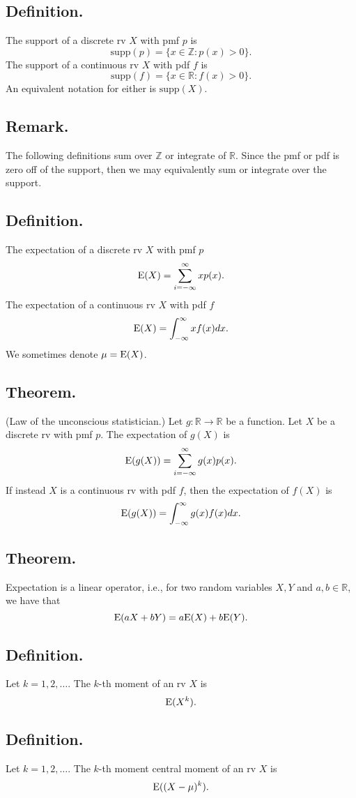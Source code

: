 \documentclass[titlepage]{article}
\begin{document}
\subsection{Definition.} The support of a discrete rv $X$ with pmf $p$ is  
$$\text{supp}(p) = \{x \in \mathbb{Z} : p(x) > 0\}.$$
The support of a continuous rv $X$ with pdf $f$ is
$$\text{supp}(f) = \{x \in \mathbb{R} : f(x) > 0\}.$$
An equivalent notation for either is $\text{supp}(X)$.

\subsection{Remark.} The following definitions sum over $\mathbb{Z}$ or integrate of $\mathbb{R}$. Since the pmf or pdf is zero off of the support, then we may equivalently sum or integrate over the support.

\subsection{Definition.} The expectation of a discrete rv $X$ with pmf $p$
$$\text{E}(X) = \sum_{i=-\infty}^{\infty}xp(x).$$
The expectation of a continuous rv $X$ with pdf $f$
$$\text{E}(X) = \int_{-\infty}^{\infty}xf(x)dx.$$
We sometimes denote $\mu = \text{E}(X)$.

\subsection{Theorem.} (Law of the unconscious statistician.) Let $g: \mathbb{R} \to \mathbb{R}$ be a function. Let $X$ be a discrete rv with pmf $p$. The expectation of $g(X)$ is 
$$\text{E}(g(X)) = \sum_{i=-\infty}^{\infty}g(x)p(x).$$
If instead $X$ is a continuous rv with pdf $f$, then the expectation of $f(X)$ is
$$\text{E}(g(X)) = \int_{-\infty}^{\infty}g(x)f(x)dx.$$

\subsection{Theorem.} Expectation is a linear operator, i.e., for two random variables $X, Y$ and $a, b \in \mathbb{R}$, we have that 
$$\text{E}(aX + bY) = a\text{E}(X) + b\text{E}(Y).$$

\subsection{Definition.} Let $k = 1, 2, \ldots$. The $k$-th moment of an rv $X$ is 
$$\text{E}(X^{k}).$$

\subsection{Definition.} Let $k = 1, 2, \ldots$. The $k$-th moment central moment of an rv $X$ is 
$$\text{E}((X-\mu)^{k}).$$
\end{document}
